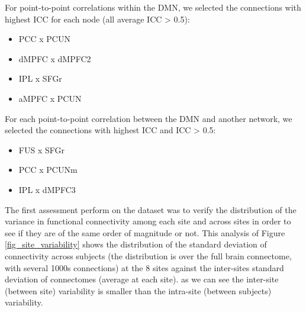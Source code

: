 \documentclass[authoryear]{elsarticle}
\begin{document}
For point-to-point correlations within the DMN, we selected the connections with highest ICC for each node (all average ICC > 0.5):
\begin{itemize}
\item PCC x PCUN
\item dMPFC x dMPFC2
\item IPL x SFGr
\item aMPFC x PCUN
\end{itemize}
For each point-to-point correlation between the DMN and another network, we selected the connections with highest ICC and ICC > 0.5:
\begin{itemize}
\item FUS x SFGr
\item PCC x PCUNm
\item IPL x dMPFC3
\end{itemize}


The first assessment perform on the dataset was to verify the distribution of the variance in functional connectivity among each site and across sites in order to see if they are of the same order of magnitude or not. This analysis of Figure \ref{fig_site_variability} shows the distribution of the standard deviation of connectivity across subjects (the distribution is over the full brain connectome, with several 1000s connections) at the 8 sites against the inter-sites standard deviation of connectomes (average at each site). as we can see the inter-site (between site) variability is smaller than the intra-site (between subjects) variability.
\end{document}
